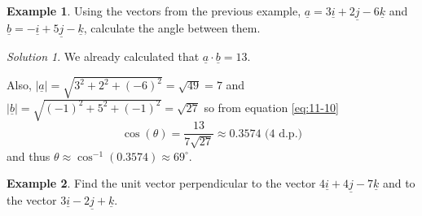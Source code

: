 \documentclass[
  english,
  11pt,
  oneside]{book}
\newcommand{\slide}{}
\theoremstyle{definition}
\theoremstyle{definition}
\newtheorem{example}{Example}[chapter]
\theoremstyle{definition}
\theoremstyle{definition}
\theoremstyle{remark}
\newtheorem*{solution}{Solution}
\begin{document}
\slide

\slide

\begin{example}
Using the vectors from the previous example, \(\underline a = 3\underline i + 2\underline j - 6\underline k\) and \(\underline b = -\underline i + 5\underline j - \underline k\), calculate the angle between them.
\end{example}

\begin{solution}
We already calculated that \(\underline a\cdot\underline b = 13\).

Also, \(|\underline a| = \sqrt{3^2+2^2+(-6)^2}=\sqrt{49}=7\) and \(|\underline b| = \sqrt{(-1)^2+5^2+(-1)^2} = \sqrt{27}\) so from equation \eqref{eq:11-10}
\[
\cos(\theta) = \frac{13}{7\sqrt{27}} \approx 0.3574 \text{ (4 d.p.)}
\]
and thus \(\theta \approx \cos^{-1}(0.3574) \approx 69^\circ\).
\end{solution}

\slide

\begin{example}
Find the unit vector perpendicular to the vector \(4\underline i+4\underline j-7\underline k\) and to the vector \(3\underline i - 2\underline j+\underline k\).
\end{example}
\end{document}
